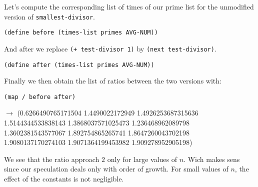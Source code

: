 \documentclass[a4paper,12pt]{article}
\begin{document}
Let's compute the corresponding list of times of our prime list for
the unmodified version of \lstinline!smallest-divisor!.
\begin{lstlisting}
(define before (times-list primes AVG-NUM))
\end{lstlisting}
And after we replace \lstinline!(+ test-divisor 1)! by
\lstinline!(next test-divisor)!.
\begin{lstlisting}
(define after (times-list primes AVG-NUM))
\end{lstlisting}
Finally we then obtain the list of ratios between the two versions with:
\begin{lstlisting}
(map / before after)
\end{lstlisting}
$\rightarrow$ (0.6266490765171504
 1.4490022172949
 1.4926253687315636 \\
 1.5144344533838143
 1.3868037571025473
 1.236468962089798 \\
 1.3602381543577067
 1.892754865265741
 1.8647260043702198 \\
 1.9080137170274103
 1.9071364199453982
 1.909278952905198)

We see that the ratio approach $2$ only for large values of $n$.  Wich
makes sens since our speculation deals only with order of growth.  For
small values of $n$,  the effect of the constants is not negligible.
\end{document}
